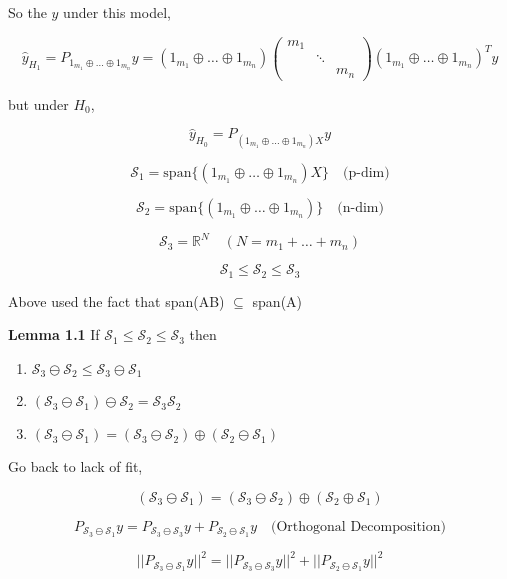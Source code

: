 \documentclass[11pt,fleqn]{book} %
\begin{document}
So the $\hat{y}$ under this model, 

$$\hat{y}_{H_1} = P_{1_{m_1} \oplus \dots \oplus 1_{m_n}} y = (1_{m_1} \oplus \dots \oplus 1_{m_n}) \begin{pmatrix}
	m_1 & & \\
	 & \ddots & \\
	  &  & m_n
\end{pmatrix} (1_{m_1} \oplus \dots \oplus 1_{m_n})^T y$$

but under $H_0$, 

$$ \hat{y}_{H_0} = P_{(1_{m_1} \oplus \dots \oplus 1_{m_n})X} y$$

$$\mathscr{S}_1 = \text{span}\{(1_{m_1} \oplus \dots \oplus 1_{m_n})X \} \quad \text{(p-dim)}$$

$$\mathscr{S}_2 = \text{span}\{(1_{m_1} \oplus \dots \oplus 1_{m_n}) \} \quad \text{(n-dim)}$$

$$\mathscr{S}_3 = \mathbb{R}^N \quad (N = m_1 + \dots + m_n)$$

$$ \mathscr{S}_1 \leq \mathscr{S}_2 \leq \mathscr{S}_3 $$

\begin{remark}
	Above used the fact that span(AB) $\subseteq$ span(A)
\end{remark}

\textbf{Lemma 1.1} If $ \mathscr{S}_1 \leq \mathscr{S}_2 \leq \mathscr{S}_3$ then

\begin{enumerate}
	\item $\mathscr{S}_3 \ominus \mathscr{S}_2 \leq \mathscr{S}_3 \ominus \mathscr{S}_1$		  \item $(\mathscr{S}_3 \ominus \mathscr{S}_1) \ominus \mathscr{S}_2 =  \mathscr{S}_3 \mathscr{S}_2$
	\item $(\mathscr{S}_3 \ominus \mathscr{S}_1) = (\mathscr{S}_3 \ominus \mathscr{S}_2) \oplus (\mathscr{S}_2 \ominus \mathscr{S}_1)$
 
\end{enumerate}

Go back to lack of fit, 

$$(\mathscr{S}_3 \ominus \mathscr{S}_1) = (\mathscr{S}_3 \ominus \mathscr{S}_2) \oplus (\mathscr{S}_2 \oplus \mathscr{S}_1)$$

$$P_{\mathscr{S}_3 \ominus \mathscr{S}_1}y = P_{\mathscr{S}_3 \ominus \mathscr{S}_3}y + P_{\mathscr{S}_2 \ominus \mathscr{S}_1}y \quad \text{(Orthogonal Decomposition)} $$

$$||P_{\mathscr{S}_3 \ominus \mathscr{S}_1}y||^2 = ||P_{\mathscr{S}_3 \ominus \mathscr{S}_3}y||^2 + ||P_{\mathscr{S}_2 \ominus \mathscr{S}_1}y||^2 $$
\end{document}
